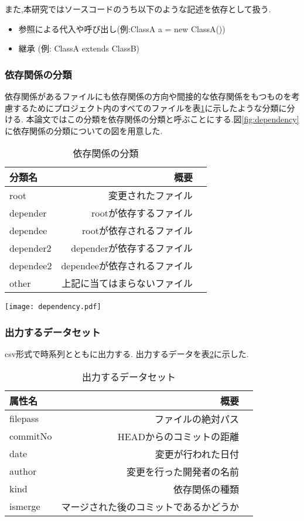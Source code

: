 \documentclass[submit,ses,noauthor]{ipsj} %
\begin{document}
また,本研究ではソースコードのうち以下のような記述を依存として扱う.
\begin{itemize}
\item 参照による代入や呼び出し(例:ClassA a = new ClassA())
\item 継承 (例: ClassA extends ClassB)
\end{itemize}


\subsubsection{依存関係の分類}
依存関係があるファイルにも依存関係の方向や間接的な依存関係をもつものを考慮するためにプロジェクト内のすべてのファイルを表\ref{tab:依存関係の分類}に示したような分類に分ける.
本論文ではこの分類を依存関係の分類と呼ぶことにする.図\ref{fig:dependency}に依存関係の分類についての図を用意した.

\begin{table}
\caption{依存関係の分類}
\begin{tabular}{|l|r|r|} \hline
分類名 & 概要 \\ \hline
root & 変更されたファイル \\ \hline
depender & rootが依存するファイル \\ \hline
dependee & rootが依存されるファイル \\ \hline
depender2 & dependerが依存するファイル \\ \hline
dependee2 & dependeeが依存されるファイル \\ \hline
other & 上記に当てはまらないファイル \\ \hline
\end{tabular}
\label{tab:依存関係の分類}
\end{table}

\begin{figure*}[t]
\centering
\texttt{[image: dependency.pdf]}
\caption{依存関係の分類図}
\label{fig:dependency} 
\end{figure*}


\subsubsection{出力するデータセット}
csv形式で時系列とともに出力する.
出力するデータを表\ref{tab:初期データセット}に示した.


\begin{table}[htb]
\caption{出力するデータセット}
\begin{tabular}{|l|r|r|} \hline
属性名 & 概要 \\ \hline
filepass & ファイルの絶対パス \\ \hline
commitNo & HEADからのコミットの距離 \\ \hline
date & 変更が行われた日付 \\ \hline
author & 変更を行った開発者の名前 \\ \hline
kind & 依存関係の種類 \\ \hline
ismerge & マージされた後のコミットであるかどうか \\ \hline
\end{tabular}
\label{tab:初期データセット}
\end{table}
\end{document}
